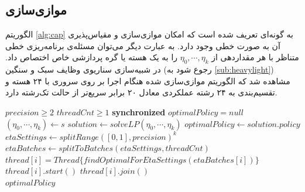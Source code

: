 \subsection{موازی‌سازی}
الگوریتم \ref{alg:cap} به گونه‌ای تعریف شده است که امکان موازی‌سازی و مقیاس‌پذیری آن به صورت خطی وجود دارد. به عبارت دیگر می‌توان مسئله‌ی برنامه‌ریزی خطی متناظر با هر مقداردهی از
$\eta_0, \cdots, \eta_k$
را به یک هسته یا گره پردازشی خاص اختصاص داد. در شبیه‌سازی سناریوی وظایف سبک و سنگین (رجوع شود به \ref{sub:heavylight}) مشاهده شد که الگوریتم موازی‌سازی شده هنگام اجرا بر روی سروری با ۲۴ هسته و تقسیم‌بندی به ۲۴ رشته عملکردی معادل ۲۰ برابر سریع‌تر از حالت تک‌رشته دارد.

\begin{latin}
	\begin{algorithm}
		\begin{algorithmic}[1]
			\Require $precision \geq 2$
			\Require $threadCnt \geq 1$
			\State \textbf{synchronized} $optimalPolicy = null$
			\State $(\eta_0, \cdots, \eta_k) \gets s$
			\State $solution \gets solveLP(\eta_0, \cdots, \eta_k)$
			\State $optimalPolicy \gets solution.policy$
			\EndIf
			\EndFor
			\EndProcedure
			\State $etaSettings \gets splitRange([0, 1], precision)^k$
			\State $etaBatches \gets splitToBatches(etaSettings, threadCnt)$
			\State \(thread[i] = Thread\{findOptimalForEtaSettings(etaBatches[i])\}\)
			\EndFor
			\State $thread[i].start()$
			\EndFor
			\State $thread[i].join()$
			\EndFor \\
			\Return $optimalPolicy$
		\end{algorithmic}
	\end{algorithm}
\end{latin}